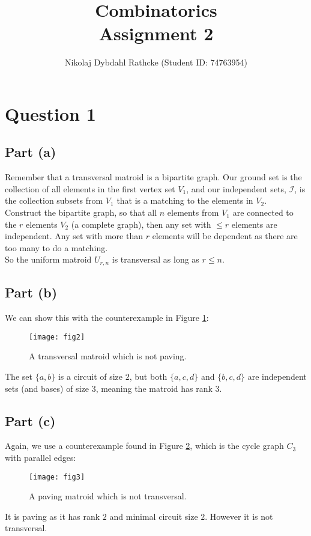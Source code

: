 \documentclass[a4paper, fleqn]{article}
\author{Nikolaj Dybdahl Rathcke (Student ID: 74763954)}
\title{Combinatorics \\ Assignment 2}
\begin{document}
\maketitle

\section*{Question 1}
\subsection*{Part (a)}
Remember that a transversal matroid is a bipartite graph. Our ground set is the
collection of all elements in the first vertex set $V_1$, and our independent sets,
$\mathcal{I}$, is the collection subsets from $V_1$ that is a matching to the elements in
$V_2$. \\
Construct the bipartite graph, so that all $n$ elements from $V_1$ are connected to the
$r$ elements $V_2$ (a complete graph), then any set with $\leq r$ elements are
independent. Any set with more than $r$ elements will be dependent as there are too many to do a matching. \\
So the uniform matroid $U_{r,n}$ is transversal as long as $r\leq n$.

\subsection*{Part (b)}
We can show this with the counterexample in Figure \ref{fig2}:
\begin{figure}[H]
  \centering
  \texttt{[image: fig2]}
  \caption{A transversal matroid which is not paving.}
  \label{fig2}
\end{figure}
The set $\{a,b\}$ is a circuit of size $2$, but both $\{a,c,d\}$ and $\{b,c,d\}$ are
independent sets (and bases) of size $3$, meaning the matroid has rank $3$.

\subsection*{Part (c)}
Again, we use a counterexample found in Figure \ref{fig3}, which is the cycle graph $C_3$
with parallel edges:
\begin{figure}[H]
  \centering
  \texttt{[image: fig3]}
  \caption{A paving matroid which is not transversal.}
  \label{fig3}
\end{figure}
It is paving as it has rank $2$ and minimal circuit size $2$. However it is not
transversal.
\end{document}
